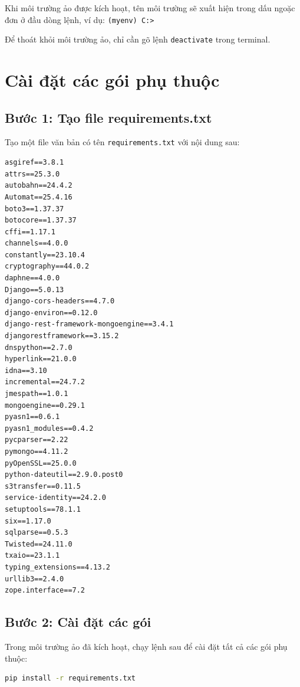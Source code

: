 Khi môi trường ảo được kích hoạt, tên môi trường sẽ xuất hiện trong dấu ngoặc đơn ở đầu dòng lệnh, ví dụ: \texttt{(myenv) C:\Users\username>}

\begin{tcolorbox}[colback=blue!5, colframe=blue!40!black, title=Mẹo]
Để thoát khỏi môi trường ảo, chỉ cần gõ lệnh \texttt{deactivate} trong terminal.
\end{tcolorbox}

\section{Cài đặt các gói phụ thuộc}

\subsection{Bước 1: Tạo file requirements.txt}

Tạo một file văn bản có tên \texttt{requirements.txt} với nội dung sau:

\begin{lstlisting}
asgiref==3.8.1
attrs==25.3.0
autobahn==24.4.2
Automat==25.4.16
boto3==1.37.37
botocore==1.37.37
cffi==1.17.1
channels==4.0.0
constantly==23.10.4
cryptography==44.0.2
daphne==4.0.0
Django==5.0.13
django-cors-headers==4.7.0
django-environ==0.12.0
django-rest-framework-mongoengine==3.4.1
djangorestframework==3.15.2
dnspython==2.7.0
hyperlink==21.0.0
idna==3.10
incremental==24.7.2
jmespath==1.0.1
mongoengine==0.29.1
pyasn1==0.6.1
pyasn1_modules==0.4.2
pycparser==2.22
pymongo==4.11.2
pyOpenSSL==25.0.0
python-dateutil==2.9.0.post0
s3transfer==0.11.5
service-identity==24.2.0
setuptools==78.1.1
six==1.17.0
sqlparse==0.5.3
Twisted==24.11.0
txaio==23.1.1
typing_extensions==4.13.2
urllib3==2.4.0
zope.interface==7.2
\end{lstlisting}

\subsection{Bước 2: Cài đặt các gói}

Trong môi trường ảo đã kích hoạt, chạy lệnh sau để cài đặt tất cả các gói phụ thuộc:

\begin{lstlisting}[language=bash]
pip install -r requirements.txt
\end{lstlisting}



